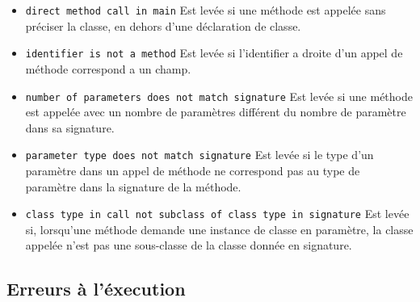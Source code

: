 \documentclass[a4paper, 10pt, french]{article}
\begin{document}
\begin{itemize}
\newline
Est levée si l'identifier a gauche d'un appel de méthode n'est pas l'instance d'une classe.
\item \texttt{direct method call in main}
\newline
Est levée si une méthode est appelée sans préciser la classe, en dehors d'une déclaration de classe.
\item \texttt{identifier is not a method}
\newline
Est levée si l'identifier a droite d'un appel de méthode correspond a un champ.
\item \texttt{number of parameters does not match signature}
\newline
Est levée si une méthode est appelée avec un nombre de paramètres différent du nombre de paramètre dans sa signature.
\item \texttt{parameter type does not match signature}
\newline
Est levée si le type d'un paramètre dans un appel de méthode ne correspond pas au type de paramètre dans la signature de la méthode.
\item \texttt{class type in call not subclass of class type in signature}
\newline
Est levée si, lorsqu'une méthode demande une instance de classe en paramètre, la classe appelée n'est pas une sous-classe de la classe donnée en signature. 

\end{itemize}


\subsection{Erreurs \`a l'\'execution}
\end{document}

